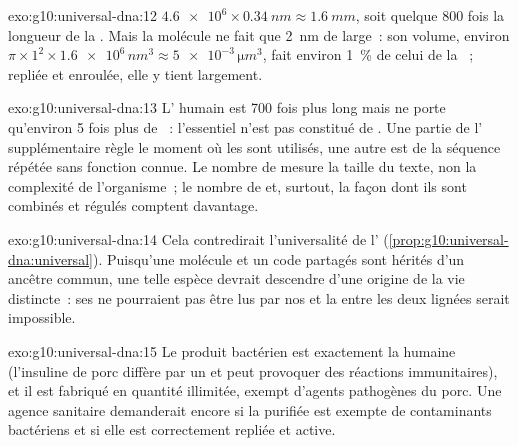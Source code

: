 \begin{solution}{exo:g10:universal-dna:12}
$\num{4.6e6} \times \qty{0.34}{nm} \approx \qty{1.6}{mm}$, soit quelque
800 fois la longueur de la . Mais la molécule ne fait que
\qty{2}{nm} de large~: son volume, environ $\pi \times 1^2 \times \num{1.6e6}\,
\unit{nm^3} \approx \num{5e-3}\,\unit{\micro m^3}$, fait environ 1~\%
de celui de la ~; repliée et enroulée, elle y tient largement.
\end{solution}

\begin{solution}{exo:g10:universal-dna:13}
L' humain est 700 fois plus long mais ne porte qu'environ 5 fois
plus de ~: l'essentiel n'est pas constitué de . Une partie de
l' supplémentaire règle le moment où les  sont utilisés, une
autre est de la séquence répétée sans fonction connue. Le nombre de
 mesure la taille du texte, non la complexité de l'organisme~; le
nombre de  et, surtout, la façon dont ils sont combinés et
régulés comptent davantage.
\end{solution}

\begin{solution}{exo:g10:universal-dna:14}
Cela contredirait l'universalité de l'
(\cref{prop:g10:universal-dna:universal}). Puisqu'une molécule et un
code partagés sont hérités d'un ancêtre commun, une telle espèce
devrait descendre d'une origine de la vie distincte~: ses  ne
pourraient pas être lus par nos  et la  entre les
deux lignées serait impossible.
\end{solution}

\begin{solution}{exo:g10:universal-dna:15}
Le produit bactérien est exactement la  humaine (l'insuline de
porc diffère par un  et peut provoquer des réactions
immunitaires), et il est fabriqué en quantité illimitée, exempt d'agents
pathogènes du porc. Une agence sanitaire demanderait encore si la
 purifiée est exempte de contaminants bactériens et si elle est
correctement repliée et active.
\end{solution}

